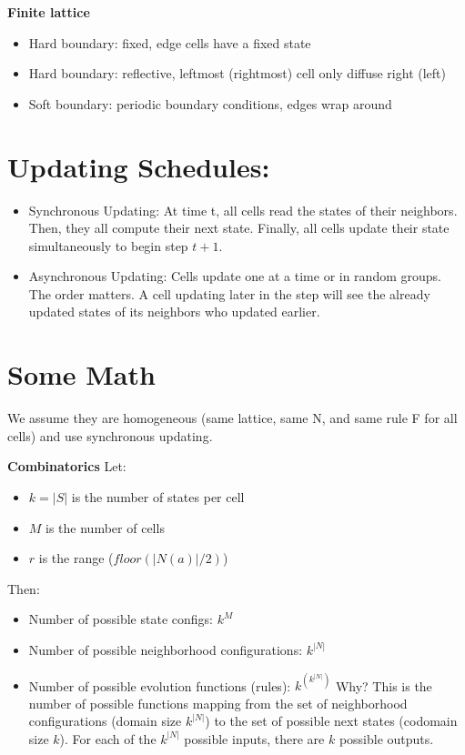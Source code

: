 \textbf{Finite lattice}
\begin{itemize}
    \item Hard boundary: fixed, edge cells have a fixed state
    \item Hard boundary: reflective, leftmost (rightmost) cell only diffuse right (left)
    \item Soft boundary: periodic boundary conditions, edges wrap around
\end{itemize}

\section*{Updating Schedules:}
\begin{itemize}
    \item Synchronous Updating: At time t, all cells read the states of
    their neighbors. Then, they all compute their next state. Finally, all cells update their state simultaneously to begin step $t+1$.
    \item Asynchronous Updating: Cells update one at a time or in random groups. The order matters. A cell updating later in the step will see the already updated states of its neighbors who updated earlier.
\end{itemize}

\section*{Some Math}
We assume they are homogeneous (same lattice, same N, and same rule F for all cells)
and use synchronous updating.

\textbf{Combinatorics}
Let:
\begin{itemize}
    \item $k = |S|$ is the number of states per cell
    \item $M$ is the number of cells
    \item $r$ is the range ($floor(|N(a)|/2)$)
\end{itemize}

Then:
\begin{itemize}
    \item Number of possible state configs: $k^{M}$
    \item Number of possible neighborhood configurations: $k^{|N|}$
    \item Number of possible evolution functions (rules): $k^{\left(k^{|N|}\right)}$
    Why? This is the number of possible functions mapping from the set of neighborhood configurations (domain size $k^{|N|}$) to the set of possible next states (codomain size $k$). For each of the $k^{|N|}$ possible inputs, there are $k$ possible outputs.
\end{itemize}


